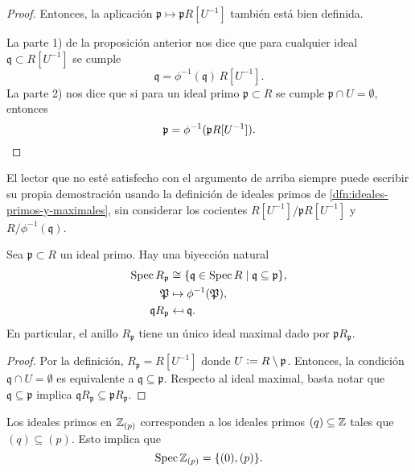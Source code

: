 \begin{corolario}
\begin{proof}
    Entonces, la aplicación $\mathfrak{p} \mapsto \mathfrak{p} R [U^{-1}]$
    también está bien definida.

    La parte 1) de la proposición anterior nos dice que para cualquier ideal
    $\mathfrak{q} \subset R [U^{-1}]$ se cumple
    $$\mathfrak{q} = \phi^{-1} (\mathfrak{q}) \, R [U^{-1}].$$
    La parte 2) nos dice que si para un ideal primo $\mathfrak{p} \subset R$
    se cumple $\mathfrak{p} \cap U = \emptyset$, entonces
    \[ \mathfrak{p} = \phi^{-1} (\mathfrak{p} R [U^{-1}]). \qedhere \]
  \end{proof}
\end{corolario}

\begin{comentario}
  El lector que no esté satisfecho con el argumento de arriba siempre puede
  escribir su propia demostración usando la definición de ideales primos
  de \ref{dfn:ideales-primos-y-maximales}, sin considerar los cocientes
  $R [U^{-1}] / \mathfrak{p} R [U^{-1}]$ y $R / \phi^{-1} (\mathfrak{q})$.
\end{comentario}

\begin{corolario}
  Sea $\mathfrak{p} \subset R$ un ideal primo. Hay una biyección natural
  \begin{align*}
    \operatorname{Spec} R_\mathfrak{p} & \cong
    \{ \mathfrak{q} \in \operatorname{Spec} R \mid \mathfrak{q} \subseteq \mathfrak{p} \},\\
    \mathfrak{P} & \mapsto \phi^{-1} (\mathfrak{P}),\\
    \mathfrak{q} R_\mathfrak{p} & \mapsfrom \mathfrak{q}.
  \end{align*}
  En particular, el anillo $R_\mathfrak{p}$ tiene un único ideal maximal dado
  por $\mathfrak{p} R_\mathfrak{p}$.

  \begin{proof}
    Por la definición, $R_\mathfrak{p} = R [U^{-1}]$ donde
    $U \mathrel{\mathop:}= R\setminus \mathfrak{p}$. Entonces, la condición
    $\mathfrak{q} \cap U = \emptyset$ es equivalente a
    $\mathfrak{q} \subseteq \mathfrak{p}$. Respecto al ideal maximal, basta
    notar que $\mathfrak{q} \subseteq \mathfrak{p}$ implica
    $\mathfrak{q} R_\mathfrak{p} \subseteq \mathfrak{p} R_\mathfrak{p}$.
  \end{proof}
\end{corolario}

\begin{ejemplo}
  Los ideales primos en $\mathbb{Z}_{(p)}$ corresponden a los ideales primos
  $(q) \subseteq \mathbb{Z}$ tales que $(q) \subseteq (p)$. Esto implica que
  \[ \operatorname{Spec} \mathbb{Z}_{(p)} = \{ (0), (p) \}. \qedhere \]
\end{ejemplo}

